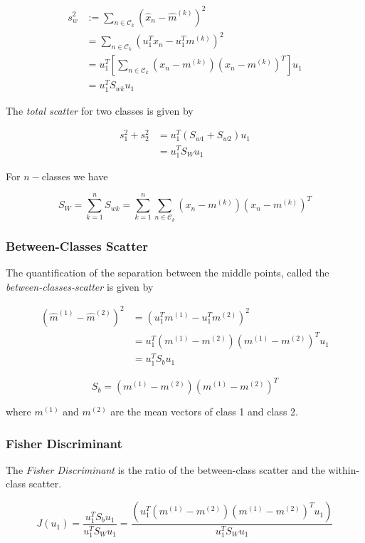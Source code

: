 \begin{align*}
    s_w^2 &:= \sum_{n \in \mathcal{C}_k} (\hat{x}_n - \hat{m}^{(k)})^2\\ 
    &= \sum_{n \in \mathcal{C}_k} (u_1^T x_n - u_1^T m^{(k)})^2 \\
    &= u_1^T \left[ \sum_{n \in \mathcal{C}_k} (x_n - m^{(k)})(x_n - m^{(k)})^T \right] u_1 \\ 
    &= u_1^T S_{wk} u_1  
\end{align*}

The \emph{total scatter} for two classes is given by

\begin{align*}
    s_1^2 + s_2^2 &= u_1^T (S_{w1} + S_{w2}) u_1 \\
    &= u_1^T S_W u_1
\end{align*}

For \(n-\)classes we have 

\[
    S_W = \sum_{k = 1}^{n} S_{wk} = \sum_{k = 1}^{n} \sum_{n \in \mathcal{C}_k} (x_n - m^{(k)})(x_n - m^{(k)})^T
\]

\subsubsection*{Between-Classes Scatter}

The quantification of the separation between the middle points, called the 
\emph{between-classes-scatter} is given by 

\begin{align*}
    (\hat{m}^{(1)} - \hat{m}^{(2)})^2 &= (u_1^T m^{(1)} - u_1^T m^{(2)})^2 \\
    &= u_1^T (m^{(1)} - m^{(2)})(m^{(1)} - m^{(2)})^T u_1 \\
    &= u_1^T S_b u_1
\end{align*}

\[
    S_b = (m^{(1)} - m^{(2)})(m^{(1)} - m^{(2)})^T
\]

where \(m^{(1)}\) and \(m^{(2)}\) are the mean vectors of class 1 and class 2. 

\subsubsection{Fisher Discriminant}

The \emph{Fisher Discriminant} is the ratio of the between-class scatter and the within-class scatter.

\[
    J(u_1) = \frac{u_1^T S_b u_1}{u_1^T S_W u_1} = \frac{(u_1^T (m^{(1)} - m^{(2)})(m^{(1)} - m^{(2)})^T u_1)}{u_1^T S_W u_1}
\]

